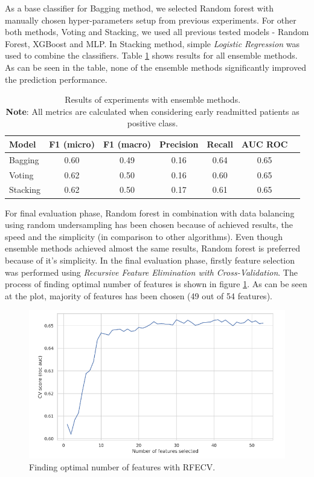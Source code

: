 \documentclass[runningheads]{llncs}
\begin{document}
As a base classifier for Bagging method, we selected Random forest with manually chosen hyper-parameters setup from previous experiments. For other both methods, Voting and Stacking, we used all previous tested models - Random Forest, XGBoost and MLP. In Stacking method, simple \textit{Logistic Regression} was used to combine the classifiers. Table \ref{table:ensemble-results} shows results for all ensemble methods. As can be seen in the table, none of the ensemble methods significantly improved the prediction performance. 
\begin{table}
    \centering
    \caption{Results of experiments with ensemble methods.\\\textbf{Note}: All metrics are calculated when considering early readmitted patients as positive class.}
    \begin{tabular}{ |l|c|c|c|c|c|c| } 
    \hline
    \textbf{Model} & \textbf{F1 (micro)} & \textbf{F1 (macro)} & \textbf{Precision} &  \textbf{Recall} &  \textbf{AUC ROC} \\
    \hline
    Bagging &   0.60    &   0.49    &   0.16    &   0.64   &   0.65\\
    Voting &   0.62    &   0.50    &   0.16    &   0.60   &   0.65\\
    Stacking &   0.62    &   0.50    &   0.17    &   0.61   &   0.65\\
    \hline
    \end{tabular}
    \label{table:ensemble-results}
\end{table}

For final evaluation phase, Random forest in combination with data balancing using random undersampling has been chosen because of achieved results, the speed and the simplicity (in comparison to other algorithms). Even though ensemble methods achieved almost the same results, Random forest is preferred because of it's simplicity. In the final evaluation phase, firstly feature selection was performed using \textit{Recursive Feature Elimination with Cross-Validation}. The process of finding optimal number of features is shown in figure \ref{fig:feature-selection}. As can be seen at the plot, majority of features has been chosen (49 out of 54 features).

\begin{figure}[h]
    \centering
    \includegraphics[width=\linewidth]{figures/feature_selection.png}
    \caption{Finding optimal number of features with RFECV.}
    \label{fig:feature-selection}
\end{figure}
\end{document}
